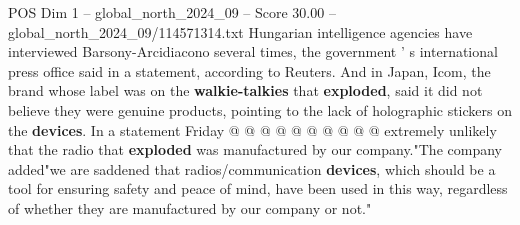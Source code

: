 \begin{textsample}{POS Dim 1 – global\_north\_2024\_09 – Score 30.00 – global\_north\_2024\_09/114571314.txt}
Hungarian intelligence agencies have interviewed Barsony-Arcidiacono several times, the government ' s international press office said in a statement, according to Reuters.
And in Japan, Icom, the brand whose label was on the \textbf{walkie-talkies} that \textbf{exploded}, said it did not believe they were genuine products, pointing to the lack of holographic stickers on the \textbf{devices}.
In a statement Friday @ @ @ @ @ @ @ @ @ @ extremely unlikely that the radio that \textbf{exploded} was manufactured by our company."The company added"we are saddened that radios/communication \textbf{devices}, which should be a tool for ensuring safety and peace of mind, have been used in this way, regardless of whether they are manufactured by our company or not."

\end{textsample}
